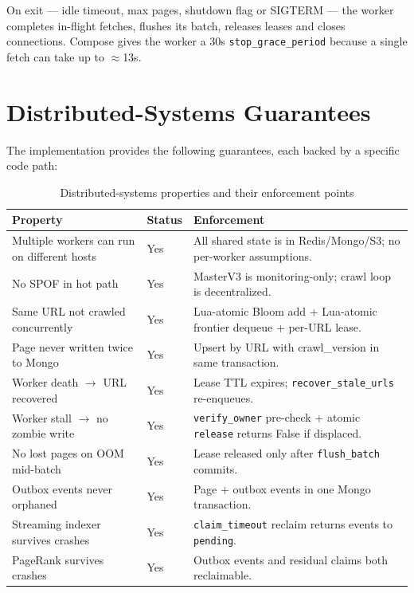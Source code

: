 \documentclass[11pt,a4paper]{article}
\newcommand{\code}[1]{\texttt{#1}}
\begin{document}
On exit --- idle timeout, max pages, shutdown flag or SIGTERM --- the worker completes in-flight fetches, flushes its batch, releases leases and closes connections. Compose gives the worker a 30s \code{stop\_grace\_period} because a single fetch can take up to $\approx$13s.

\section{Distributed-Systems Guarantees}

The implementation provides the following guarantees, each backed by a specific code path:

\begin{table}[H]
\centering
\caption{Distributed-systems properties and their enforcement points}
\small
\begin{tabular}{p{}p{}p{}}
\toprule
Property & Status & Enforcement \\
\midrule
Multiple workers can run on different hosts & Yes & All shared state is in Redis/Mongo/S3; no per-worker assumptions.\\
No SPOF in hot path & Yes & MasterV3 is monitoring-only; crawl loop is decentralized.\\
Same URL not crawled concurrently & Yes & Lua-atomic Bloom add + Lua-atomic frontier dequeue + per-URL lease.\\
Page never written twice to Mongo & Yes & Upsert by URL with crawl\_version in same transaction.\\
Worker death $\to$ URL recovered & Yes & Lease TTL expires; \code{recover\_stale\_urls} re-enqueues.\\
Worker stall $\to$ no zombie write & Yes & \code{verify\_owner} pre-check + atomic \code{release} returns False if displaced.\\
No lost pages on OOM mid-batch & Yes & Lease released only after \code{flush\_batch} commits.\\
Outbox events never orphaned & Yes & Page + outbox events in one Mongo transaction.\\
Streaming indexer survives crashes & Yes & \code{claim\_timeout} reclaim returns events to \code{pending}.\\
PageRank survives crashes & Yes & Outbox events and residual claims both reclaimable.\\

\end{tabular}
\end{table}
\end{document}
